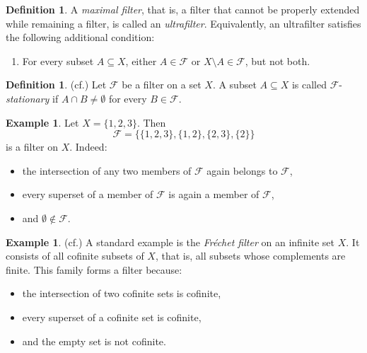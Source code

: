 \documentclass[10pt]{book}
\theoremstyle{definition}
\newtheorem{definition}[theorem]{Definition}
\newtheorem{example}[theorem]{Example}
\begin{document}
\begin{definition}
A \emph{maximal filter}, that is, a filter that cannot be properly extended while remaining a filter, is called an \emph{ultrafilter}.  
Equivalently, an ultrafilter satisfies the following additional condition:
\begin{enumerate}
    \item[(BT1)] For every subset \(A\subseteq X\), either \(A\in\mathcal{F}\) or \(X\setminus A\in\mathcal{F}\), but not both.
\end{enumerate}
\end{definition}

\begin{definition} (cf.\cite{kaufmann1985chapter,alechina1994correspondence})
Let \(\mathcal{F}\) be a filter on a set \(X\).  
A subset \(A\subseteq X\) is called \(\mathcal{F}\)-\emph{stationary} if \(A\cap B\neq\emptyset\) for every \(B\in\mathcal{F}\).
\end{definition}

\begin{example}
Let \(X=\{1,2,3\}\).  
Then
\[
\mathcal{F}=\bigl\{\{1,2,3\},\{1,2\},\{2,3\},\{2\}\bigr\}
\]
is a filter on \(X\). Indeed:
\begin{itemize}
    \item the intersection of any two members of \(\mathcal{F}\) again belongs to \(\mathcal{F}\),
    \item every superset of a member of \(\mathcal{F}\) is again a member of \(\mathcal{F}\),
    \item and \(\emptyset\notin\mathcal{F}\).
\end{itemize}
\end{example}

\begin{example} (cf.\cite{garcia2014ordering,jordan2004productively})
A standard example is the \emph{Fr\'echet filter} on an infinite set \(X\).  
It consists of all cofinite subsets of \(X\), that is, all subsets whose complements are finite.  
This family forms a filter because:
\begin{itemize}
    \item the intersection of two cofinite sets is cofinite,
    \item every superset of a cofinite set is cofinite,
    \item and the empty set is not cofinite.
\end{itemize}
\end{example}
\end{document}
